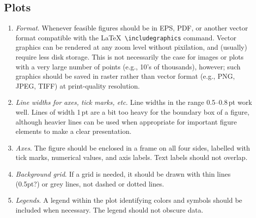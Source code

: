 \documentclass[letterpaper,11pt]{article}
\begin{document}
\subsection{Plots}

\begin{enumerate}
\item {\it Format\/}. Whenever feasible figures should be in EPS, PDF, or another vector format
compatible with the La\TeX\ \verb|\includegraphics| command. Vector graphics can be rendered at any zoom level without pixilation, and (usually) require less disk storage. This is not necessarily the case for images or plots with a very large number of points (e.g., 10's of thousands), however; such graphics should be saved in raster rather than vector format (e.g., PNG, JPEG, TIFF) at print-quality resolution.

\item {\it Line widths for axes, tick marks, etc.\/} Line widths in the range 0.5--0.8\,pt 
 work well.  Lines of width 1\,pt are a bit too heavy for
the boundary box of a figure, although heavier lines can be used when
appropriate for important figure elements to make a clear presentation.  

\item {\it Axes\/}. The figure should be enclosed in a frame on all four
sides, labelled with tick marks, numerical values, and axis labels.  Text
labels should not overlap.


\item {\it Background grid\/}.  If a grid is needed, it should be drawn with
thin lines (0.5pt?) or grey lines, not dashed or dotted lines.

\item {\it Legends\/}.  A legend within the plot identifying colors and
symbols should be included when necessary.  The legend should not obscure data.
\end{enumerate}
\end{document}
